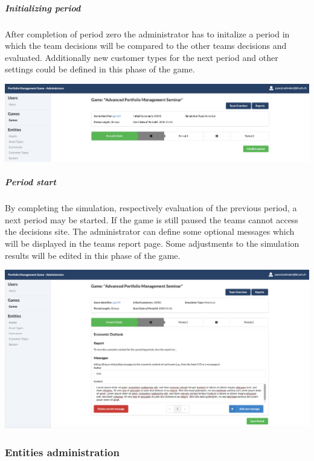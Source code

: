 \subparagraph{Initializing period}
After completion of period zero the administrator has to initalize a period in which the team decisions will be compared to the other teams decisions and evaluated. Additionally new customer types for the next period and other settings could be defined in this phase of the game.
\begin{center}
  \includegraphics[scale=0.2]{img/application-overview/administrator/period_initialization.png}
\end{center}

\subparagraph{Period start}
By completing the simulation, respectively evaluation of the previous period, a next period may be started. If the game is still paused the teams cannot access the decisions site. The administrator can define some optional messages which will be displayed in the teams report page. Some adjustments to the simulation results will be edited in this phase of the game.
\begin{center}
  \includegraphics[scale=0.2]{img/application-overview/administrator/period_start.png}
\end{center}

\subsubsection{Entities administration}


